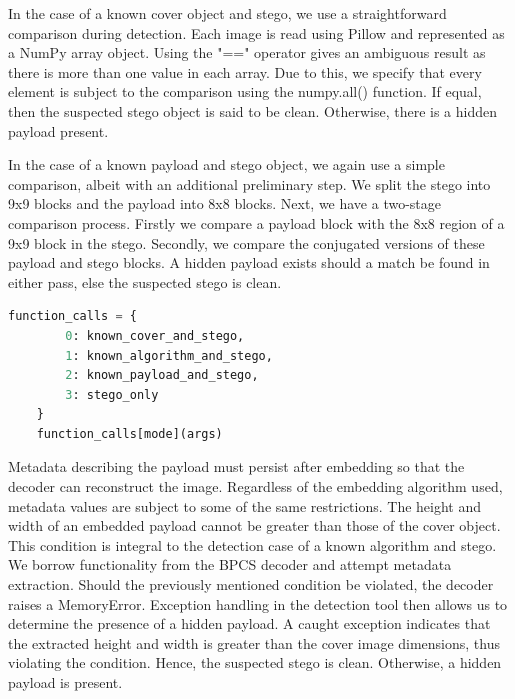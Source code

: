 \documentclass{l4proj}
\begin{document}
In the case of a known cover object and stego, we use a straightforward comparison during detection. Each image is read using Pillow and represented as a NumPy array object. Using the "==" operator gives an ambiguous result as there is more than one value in each array. Due to this, we specify that every element is subject to the comparison using the numpy.all() \citep{all} function. If equal, then the suspected stego object is said to be clean. Otherwise, there is a hidden payload present. 

In the case of a known payload and stego object, we again use a simple comparison, albeit with an additional preliminary step. We split the stego into 9x9 blocks and the payload into 8x8 blocks. Next, we have a two-stage comparison process. Firstly we compare a payload block with the 8x8 region of a 9x9 block in the stego. Secondly, we compare the conjugated versions of these payload and stego blocks. A hidden payload exists should a match be found in either pass, else the suspected stego is clean.

\begin{lstlisting}[language=python, float, caption={Detection tool dictionary mapping user selected detection case to functions in the program.}, label=lst:detection_tool_dict]
    function_calls = {
        0: known_cover_and_stego,
        1: known_algorithm_and_stego,
        2: known_payload_and_stego,
        3: stego_only
    }
    function_calls[mode](args)
\end{lstlisting}


Metadata describing the payload must persist after embedding so that the decoder can reconstruct the image.  Regardless of the embedding algorithm used, metadata values are subject to some of the same restrictions. The height and width of an embedded payload cannot be greater than those of the cover object. This condition is integral to the detection case of a known algorithm and stego. We borrow functionality from the BPCS decoder and attempt metadata extraction. Should the previously mentioned condition be violated, the decoder raises a MemoryError. Exception handling in the detection tool then allows us to determine the presence of a hidden payload. A caught exception indicates that the extracted height and width is greater than the cover image dimensions, thus violating the condition. Hence, the suspected stego is clean. Otherwise, a hidden payload is present.
\end{document}
